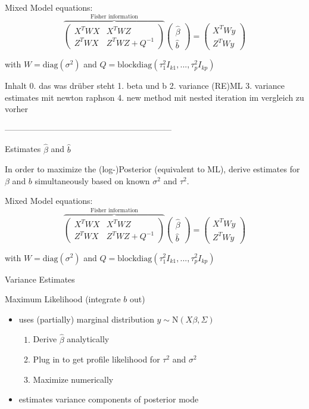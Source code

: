\documentclass[12pt]{article}
\begin{document}
Mixed Model equations:
$$\overbrace{\begin{pmatrix}
X^TWX & X^TWZ \\
Z^TWX & Z^TWZ + Q^{-1}
\end{pmatrix}}^{\text{Fisher information}}
\begin{pmatrix}
\hat{\beta} \\
\hat{b}
\end{pmatrix} =
\begin{pmatrix}
X^TWy \\
Z^TWy
\end{pmatrix}$$

 with $W=\text{diag}(\sigma^2)$ and $Q=\text{blockdiag}(\tau_1^2I_{k1},..., \tau_p^2I_{kp})$



Inhalt
0. das was drüber steht
1. beta und b
2. variance (RE)ML
3. variance estimates mit newton raphson
4. new method mit nested iteration im vergleich zu vorher

------------------------------------------------------------


Estimates $\hat{\beta}$ and $\hat{b}$

In order to maximize the (log-)Posterior (equivalent to ML), derive estimates for $\beta$ and $b$ simultaneously based on known $\sigma^2$ and $\tau^2$.


Mixed Model equations:
$$\overbrace{\begin{pmatrix}
X^TWX & X^TWZ \\
Z^TWX & Z^TWZ + Q^{-1}
\end{pmatrix}}^{\text{Fisher information}}
\begin{pmatrix}
\hat{\beta} \\
\hat{b}
\end{pmatrix} =
\begin{pmatrix}
X^TWy \\
Z^TWy
\end{pmatrix}$$

 with $W=\text{diag}(\sigma^2)$ and $Q=\text{blockdiag}(\tau_1^2I_{k1},..., \tau_p^2I_{kp})$


Variance Estimates

Maximum Likelihood (integrate $b$ out)

\begin{itemize}
\item uses (partially) marginal distribution $y \sim \mathrm{N}(X\beta,\Sigma)$

\begin{enumerate}
\item Derive $\hat{\beta}$ analytically
\item Plug in to get profile likelihood for $\tau^2$ and $\sigma^2$
\item Maximize numerically
\end{enumerate}

\item estimates variance components of posterior mode
\end{itemize}
\end{document}

